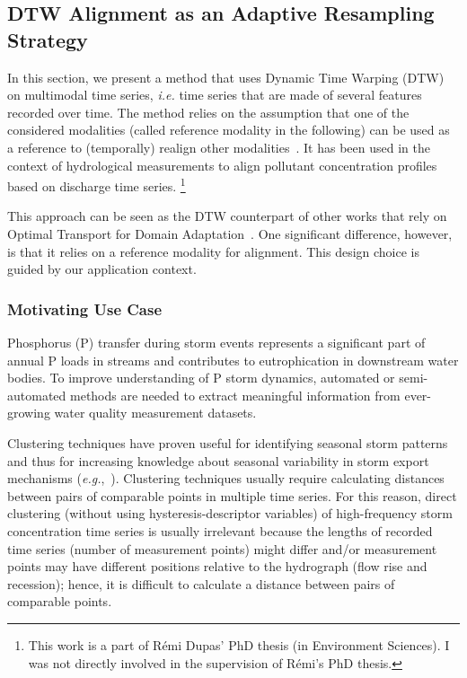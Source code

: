 \subsection{DTW Alignment as an Adaptive Resampling Strategy}

In this section, we present a method that uses Dynamic Time Warping (DTW)
on multimodal time series, \emph{i.e.} time series that are made of several
features recorded over time.
The method relies on the assumption that one of the considered modalities
(called
reference modality in the following) can be used as a reference to (temporally)
realign other modalities~\cite{dupas:halshs-01228397}.
It has been used in the context of hydrological measurements to align pollutant
concentration profiles based on discharge time series.%
\footnote{This work is a part of Rémi Dupas' PhD thesis (in Environment
Sciences).
I was not directly involved in the supervision of Rémi's PhD thesis.}

This approach can be seen as the DTW counterpart of other works that rely on
Optimal Transport for Domain Adaptation~\cite{courty:hal-02112785}.
One significant difference, however, is that it relies on a reference modality
for
alignment.
This design choice is guided by our application context.

\subsubsection{Motivating Use Case}

Phosphorus (P) transfer during storm events represents a significant part of
annual P loads in streams and contributes to eutrophication in downstream water
bodies. To improve understanding of P storm dynamics, automated or
semi-automated methods are needed to extract meaningful information from
ever-growing water quality measurement datasets.

Clustering techniques have proven useful for identifying seasonal storm
patterns and thus for increasing knowledge about seasonal variability in storm
export mechanisms (\emph{e.g.},~\cite{aubert:halshs-00906292}).
Clustering techniques usually require calculating distances between pairs of
comparable points in multiple time series. For this reason, direct clustering
(without using hysteresis-descriptor variables) of high-frequency storm
concentration time series is usually irrelevant because the lengths of recorded
time series (number of
measurement points) might differ and/or measurement points may have different
positions relative to the hydrograph (flow rise and recession); hence, it is
difficult to calculate a distance between pairs of comparable points.

